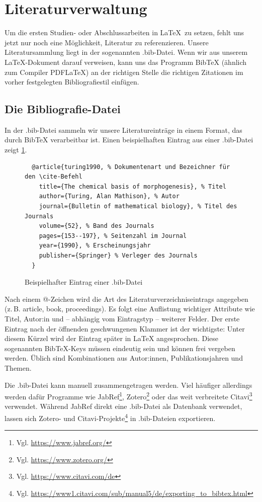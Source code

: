 \section{Literaturverwaltung}
\label{sec:literatur}

Um die ersten Studien- oder Abschlussarbeiten in \LaTeX\ zu setzen, fehlt uns jetzt nur noch eine Möglichkeit, Literatur zu referenzieren.
Unsere Literatursammlung liegt in der sogenannten .bib-Datei.
Wenn wir aus unserem \LaTeX-Dokument darauf verweisen, kann uns das Programm BibTeX (ähnlich zum Compiler PDFLaTeX) an der richtigen Stelle die richtigen Zitationen im vorher festgelegten Bibliografiestil einfügen.

\subsection{Die Bibliografie-Datei}
In der .bib-Datei sammeln wir unsere Literatureinträge in einem Format, das durch BibTeX verarbeitbar ist.
Einen beispielhaften Eintrag aus einer .bib-Datei zeigt \cref{lst:bibfile-sample-entry}.

\begin{figure}[H]
  \begin{verbatim}
  @article{turing1990, % Dokumentenart und Bezeichner für den \cite-Befehl
    title={The chemical basis of morphogenesis}, % Titel
    author={Turing, Alan Mathison}, % Autor
    journal={Bulletin of mathematical biology}, % Titel des Journals
    volume={52}, % Band des Journals
    pages={153--197}, % Seitenzahl im Journal
    year={1990}, % Erscheinungsjahr
    publisher={Springer} % Verleger des Journals
  }
  \end{verbatim}
  \caption{Beispielhafter Eintrag einer .bib-Datei}
  \label{lst:bibfile-sample-entry}
\end{figure}

Nach einem @-Zeichen wird die Art des Literaturverzeichniseintrags angegeben (z.\,B. article, book, proceedings).
Es folgt eine Auflistung wichtiger Attribute wie Titel, Autor:in und – abhängig vom Eintragstyp – weiterer Felder.
Der erste Eintrag nach der öffnenden geschwungenen Klammer ist der wichtigste: 
Unter diesem Kürzel wird der Eintrag später in LaTeX angesprochen.
Diese sogenannten BibTeX-Keys müssen eindeutig sein und können frei vergeben werden.
Üblich sind Kombinationen aus Autor:innen, Publikationsjahren und Themen.


Die .bib-Datei kann manuell zusammengetragen werden.
Viel häufiger allerdings werden dafür Programme wie JabRef\footnote{Vgl. \url{https://www.jabref.org/}}, Zotero\footnote{Vgl. \url{https://www.zotero.org/}} oder das weit verbreitete Citavi\footnote{Vgl. \url{https://www.citavi.com/de}} verwendet.
Während JabRef direkt eine .bib-Datei als Datenbank verwendet, lassen sich Zotero- und Citavi-Projekte\footnote{Vgl. \url{https://www1.citavi.com/sub/manual5/de/exporting_to_bibtex.html}} in .bib-Dateien exportieren.

